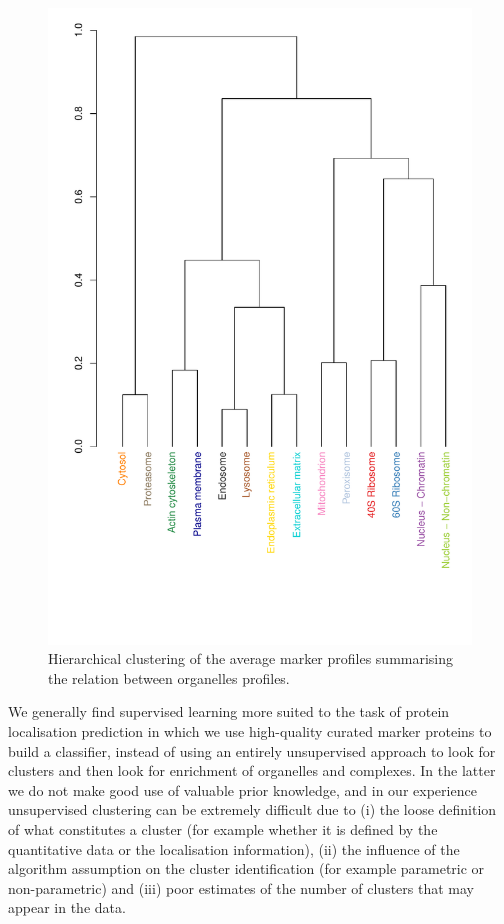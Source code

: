 \begin{figure}[!ht]
  \centering
\begin{knitrout}
\color{fgcolor}\begin{kframe}
\begin{alltt}
\hlstd{(} \hlstd{=} \hlstd{(}\hlstd{,} \hlstd{,} \hlstd{,} \hlstd{))} 
\end{alltt}
\end{kframe}
\includegraphics[width=.5\textwidth,angle=-90]{figure/hclust-1} 

\end{knitrout}
  \caption{Hierarchical clustering of the average marker profiles summarising the relation between organelles profiles.}
  \label{fig:mrkHclust}
\end{figure}

We generally find supervised learning more suited to the task of
protein localisation prediction in which we use high-quality curated
marker proteins to build a classifier, instead of using an entirely
unsupervised approach to look for clusters and then look for
enrichment of organelles and complexes. In the latter we do not make
good use of valuable prior knowledge, and in our experience
unsupervised clustering can be extremely difficult due to
(i) the loose definition of what constitutes a cluster (for example
whether it is defined by the quantitative data or the localisation
information), (ii) the influence of the algorithm assumption on the
cluster identification (for example parametric or non-parametric)
and (iii) poor estimates of the number of clusters that may appear
in the data.

